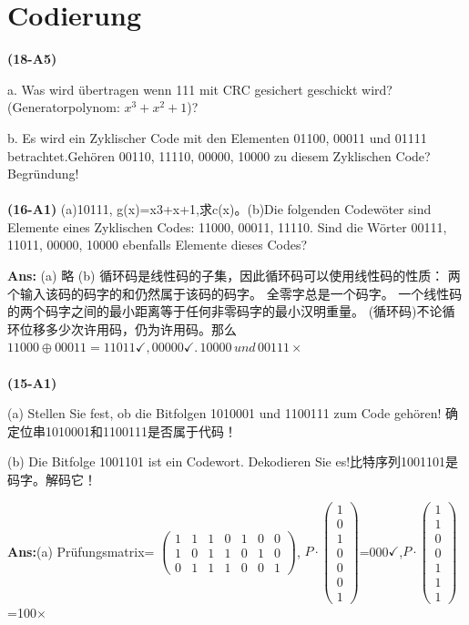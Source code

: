 \documentclass[fleqn]{article}
\begin{document}



\pagestyle{main}

\tableofcontents

\clearpage

\section{Codierung} 

\noindent \textbf{(18-A5)}

a. Was wird übertragen wenn 111 mit CRC gesichert geschickt wird? (Generatorpolynom: $x^3+x^2+1$)?

b. Es wird ein Zyklischer Code mit den Elementen 01100, 00011 und 01111 betrachtet.Gehören 00110, 11110, 00000, 10000 zu diesem Zyklischen Code? Begründung!
\\
\\
\noindent \textbf{(16-A1)} (a)10111, g(x)=x3+x+1,求c(x)。(b)Die folgenden Codewöter sind Elemente eines Zyklischen Codes: 11000, 00011, 11110. Sind die Wörter 00111, 11011, 00000, 10000 ebenfalls Elemente dieses Codes?

\textbf{Ans:} (a) 略 (b) 循环码是线性码的子集，因此循环码可以使用线性码的性质：
两个输入该码的码字的和仍然属于该码的码字。
全零字总是一个码字。
一个线性码的两个码字之间的最小距离等于任何非零码字的最小汉明重量。
(循环码)不论循环位移多少次许用码，仍为许用码。那么$11000\oplus00011=11011\checkmark,00000\checkmark.\,10000\, und\, 00111\times $
\\
\\
\noindent \textbf{(15-A1)}

(a) Stellen Sie fest, ob die Bitfolgen 1010001 und 1100111 zum Code gehören! 确定位串1010001和1100111是否属于代码！

(b) Die Bitfolge 1001101 ist ein Codewort. Dekodieren Sie es!比特序列1001101是码字。解码它！

\textbf{Ans:}(a) Prüfungsmatrix= 
$\begin{pmatrix}
    1&1&1&0&1&0&0\\
    1&0&1&1&0&1&0\\
    0&1&1&1&0&0&1
\end{pmatrix}
$,
$P\cdot \begin{pmatrix}
    1\\0\\1\\0\\0\\0\\1
\end{pmatrix}$=000$\checkmark$,$P\cdot\begin{pmatrix}
    1\\1\\0\\0\\1\\1\\1
\end{pmatrix}$=100$\times$
\end{document}
